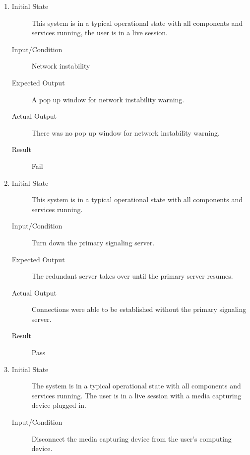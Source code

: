 \documentclass[12pt, titlepage]{article}
\begin{document}
\begin{enumerate}[NFR-T1]
  \item \label{NFRT8}
    \begin{description}
    \item[Initial State] This system is in a typical operational state with all
      components and services running, the user is in a live session.
    \item[Input/Condition] Network instability
    \item[Expected Output] A pop up window for network instability warning.
    \item[Actual Output] There was no pop up window for network instability warning.
    \item[Result] Fail
    \end{description}
  \item \label{NFRT9}
    \begin{description}
    \item[Initial State] This system is in a typical operational state with all
      components and services running.
    \item[Input/Condition] Turn down the primary signaling server.
    \item[Expected Output] The redundant server takes over until the primary server
      resumes.
    \item[Actual Output] Connections were able to be established without the primary 
    signaling server.
    \item[Result] Pass 
    \end{description}
  \item \label{NFRT10}
    \begin{description}
    \item[Initial State] The system is in a typical operational state with all
      components and services running. The user is in a live session with a media
      capturing device plugged in.
    \item[Input/Condition] Disconnect the media capturing device from the user’s
      computing device.

\end{description}
\end{enumerate}
\end{document}

